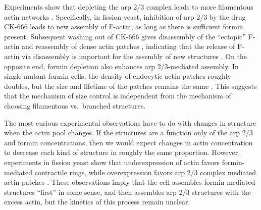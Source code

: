 \documentclass[11pt]{article}
\newcommand{\red}[1]{\color{red}#1\normalcolor}
\begin{document}
Experiments show that depleting the arp 2/3 complex leads to more filamentous actin networks \cite{rotty2015competition}. Specifically, in fission yeast, inhibition of arp 2/3 by the drug CK-666 leads to new assembly of F-actin, as long as there is sufficient formin present. Subsequent washing out of CK-666 gives disassembly of the ``ectopic'' F-actin and reassembly of dense actin patches \cite{burke2014homeostatic}, indicating that the release of F-actin via disassembly is important for the assembly of new structures \cite{suarez2016internetwork}. On the opposite end, formin depletion also enhances arp 2/3-mediated assembly. In single-mutant formin cells, the density of endocytic actin patches roughly doubles, but the size and lifetime of the patches remains the same \cite{burke2014homeostatic}. This suggests that the mechanism of size control is independent from the mechanism of choosing filamentous vs.\ branched structures. 

The most curious experimental observations have to do with changes in structure when the actin pool changes. If the structures are a function only of the arp 2/3 and formin concentrations, then we would expect changes in actin concentration to decrease each kind of structure in roughly the same proportion. However, experiments in fission yeast show that underexpression of actin favors formin-mediated contractile rings, while overexpression favors arp 2/3 complex mediated actin patches \cite{burke2014homeostatic}. These observations imply that the cell assembles formin-mediated structures ``first'' in some sense, and then assembles arp 2/3 structures with the excess actin, but the kinetics of this process remain unclear.

\end{document}
